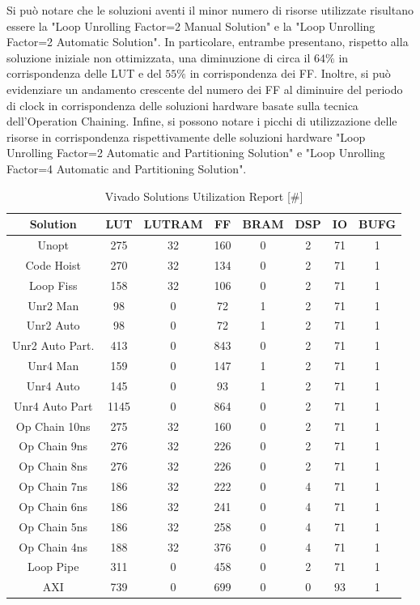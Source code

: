 Si può notare che le soluzioni aventi il minor numero di risorse utilizzate risultano essere la "Loop Unrolling Factor=2 Manual Solution" e la "Loop Unrolling Factor=2 Automatic Solution". In particolare, entrambe presentano, rispetto alla soluzione iniziale non ottimizzata, una diminuzione di circa il $64\%$ in corrispondenza delle LUT e del $55\%$ in corrispondenza dei FF. Inoltre, si può evidenziare un andamento crescente del numero dei FF al diminuire del periodo di clock in corrispondenza delle soluzioni hardware basate sulla tecnica dell'Operation Chaining. Infine, si possono notare i picchi di utilizzazione delle risorse in corrispondenza rispettivamente delle soluzioni hardware "Loop Unrolling Factor=2 Automatic and Partitioning Solution" e "Loop Unrolling Factor=4 Automatic and Partitioning Solution".

\begin{table}[H]
	\centering
	\begin{tabular}{|c|c|c|c|c|c|c|c|}
		\hline
		\textbf{Solution} & \textbf{LUT} & \textbf{LUTRAM} & \textbf{FF} & \textbf{BRAM} & \textbf{DSP} & \textbf{IO} & \textbf{BUFG} \\
		\hline
		Unopt & 275 & 32 & 160 & 0 & 2 & 71 & 1 \\
		Code Hoist & 270 & 32 & 134 & 0 & 2 & 71 & 1 \\
		Loop Fiss & 158 & 32 & 106 & 0 & 2 & 71 & 1 \\
		Unr2 Man & 98 & 0 & 72 & 1 & 2 & 71 & 1 \\
		Unr2 Auto & 98 & 0 & 72 & 1 & 2 & 71 & 1 \\
		Unr2 Auto Part. & 413 & 0 & 843 & 0 & 2 & 71 & 1 \\
		Unr4 Man & 159 & 0 & 147 & 1 & 2 & 71 & 1 \\
		Unr4 Auto & 145 & 0 & 93 & 1 & 2 & 71 & 1 \\
		Unr4 Auto Part & 1145 & 0 & 864 & 0 & 2 & 71 & 1 \\
		Op Chain 10ns & 275 & 32 & 160 & 0 & 2 & 71 & 1 \\
		Op Chain 9ns & 276 & 32 & 226 & 0 & 2 & 71 & 1 \\
		Op Chain 8ns & 276 & 32 & 226 & 0 & 2 & 71 & 1 \\
		Op Chain 7ns & 186 & 32 & 222 & 0 & 4 & 71 & 1 \\
		Op Chain 6ns & 186 & 32 & 241 & 0 & 4 & 71 & 1 \\
		Op Chain 5ns & 186 & 32 & 258 & 0 & 4 & 71 & 1 \\
		Op Chain 4ns & 188 & 32 & 376 & 0 & 4 & 71 & 1 \\
		Loop Pipe & 311 & 0 & 458 & 0 & 2 & 71 & 1 \\
		AXI & 739 & 0 & 699 & 0 & 0 & 93 & 1 \\
		\hline
	\end{tabular}
	\caption{Vivado Solutions Utilization Report [\#]}
	\label{tab:vivado-solutions-utilization-report}
\end{table}

